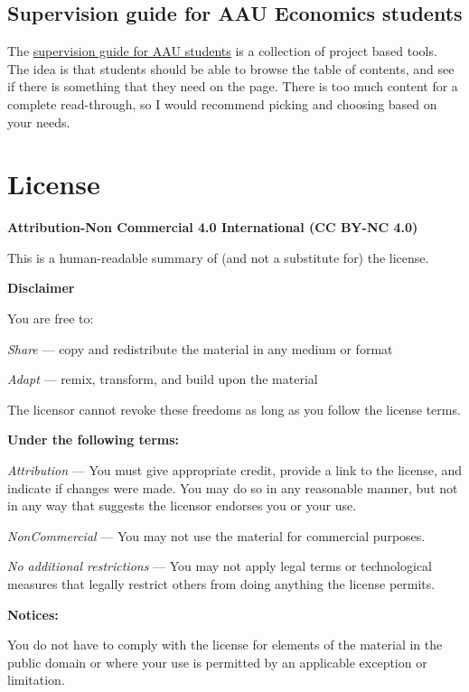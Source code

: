 \documentclass[
]{book}
\begin{document}
\hypertarget{supervision-guide-for-aau-economics-students}{%
\subsection{Supervision guide for AAU Economics students}\label{supervision-guide-for-aau-economics-students}}

The \href{https://robabsmith.github.io/supervision_gitpage/}{supervision guide for AAU students} is a collection of project based tools. The idea is that students should be able to browse the table of contents, and see if there is something that they need on the page. There is too much content for a complete read-through, so I would recommend picking and choosing based on your needs.

\hypertarget{license}{%
\section{License}\label{license}}

\textbf{Attribution-Non Commercial 4.0 International (CC BY-NC 4.0)}

This is a human-readable summary of (and not a substitute for) the license.

\textbf{Disclaimer}

You are free to:

\emph{Share} --- copy and redistribute the material in any medium or format

\emph{Adapt} --- remix, transform, and build upon the material

The licensor cannot revoke these freedoms as long as you follow the license terms.

\textbf{Under the following terms:}

\emph{Attribution} --- You must give appropriate credit, provide a link to the license, and indicate if changes were made. You may do so in any reasonable manner, but not in any way that suggests the licensor endorses you or your use.

\emph{NonCommercial} --- You may not use the material for commercial purposes.

\emph{No additional restrictions} --- You may not apply legal terms or technological measures that legally restrict others from doing anything the license permits.

\textbf{Notices:}

You do not have to comply with the license for elements of the material in the public domain or where your use is permitted by an applicable exception or limitation.
\end{document}

